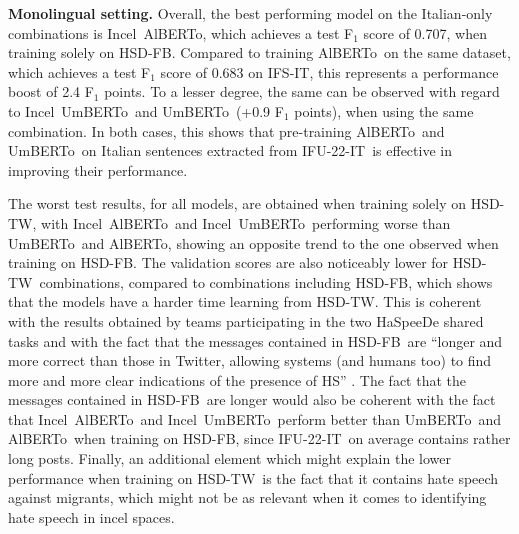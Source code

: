 \documentclass[11pt]{article}
\newcommand{\dsITcorpus}{IFU-22-IT}
\newcommand{\dsITclassification}{IFS-IT}
\newcommand{\umbert}{\mbox{UmBERTo}}
\newcommand{\albert}{\mbox{AlBERTo}}
\newcommand{\iumbert}{\mbox{Incel UmBERTo}}
\newcommand{\ialbert}{\mbox{Incel AlBERTo}}
\newcommand{\hsdfb}{\mbox{HSD-FB}}
\newcommand{\hsdtw}{\mbox{HSD-TW}}
\begin{document}
\vspace*{1mm}\noindent\textbf{Monolingual setting.}
Overall, the best performing model on the Italian-only combinations is \ialbert, which achieves a test F$_1$ score of 0.707, when training solely on \hsdfb. Compared to training \albert\, on the same dataset, which achieves a test F$_1$ score of 0.683 on \dsITclassification, this represents a performance boost of 2.4 F$_1$ points. To a lesser degree, the same can be observed with regard to \iumbert\, and \umbert\, (+0.9 F$_1$ points), when using the same combination. In both cases, this shows that pre-training \albert\, and \umbert\, on Italian sentences extracted from \dsITcorpus\, is effective in improving their performance.

The worst test results, for all models, are obtained when training solely on \hsdtw, with \ialbert\, and \iumbert\, performing worse than \umbert\, and \albert, showing an opposite trend to the one observed when training on \hsdfb.
The validation scores are also noticeably lower for \hsdtw\, combinations, compared to combinations including \hsdfb, which shows that the models have a harder time learning from \hsdtw. This is coherent with the results obtained by teams participating in the two HaSpeeDe shared tasks \cite{boscoOverviewEVALITA2018,basileEVALITA2020Overview} and with the fact that the messages contained in \hsdfb\, are ``longer and more correct than those in Twitter, allowing systems (and humans too) to find more and more clear indications of the presence of HS'' \cite{boscoOverviewEVALITA2018}. 
The fact that the messages contained in \hsdfb\, are longer would also be coherent with the fact that \ialbert\, and \iumbert\, perform better than \umbert\, and \albert\, when training on \hsdfb, since \dsITcorpus\, on average contains rather long posts.
Finally, an additional element which might explain the lower performance when training on \hsdtw\, is the fact that it contains hate speech against migrants, which might not be as relevant when it comes to identifying hate speech in incel spaces.
\end{document}
